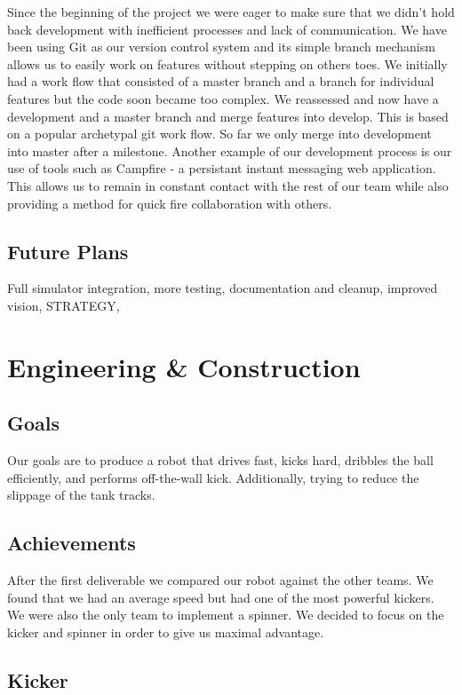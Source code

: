 \documentclass[12pt, a4paper, titlepage]{article}
\begin{document}
Since the beginning of the project we were eager to make sure that we didn't hold back development
with inefficient processes and lack of communication. We have been using Git as 
our version control system and its simple branch mechanism allows us to easily work on features
without stepping on others toes. We initially had a work flow that consisted of a master branch and
a branch for individual features but the code soon became too complex. We reassessed and now have
a development and a master branch and merge features into develop. This is based on a popular archetypal 
git work flow. So far we only merge into development into master after a milestone. Another example of 
our development process is our use of tools such as Campfire - a persistant instant messaging web 
application. This allows us to remain in constant contact with the rest of our team while also providing 
a method for quick fire collaboration with others.

\subsection{Future Plans}

Full simulator integration, more testing, documentation and cleanup, improved
vision, STRATEGY,

\section{Engineering \& Construction}

\subsection{Goals}

Our goals are to produce a robot that drives fast, kicks hard, dribbles the ball
efficiently, and performs off-the-wall kick. Additionally, trying to reduce the
slippage of the tank tracks.

\subsection{Achievements}

After the first deliverable we compared our robot against the other teams. We
found that we had an average speed but had one of the most powerful kickers.
We were also the only team to implement a spinner. We decided to focus on the
kicker and spinner in order to give us maximal advantage.

\subsection{Kicker}
\end{document}
